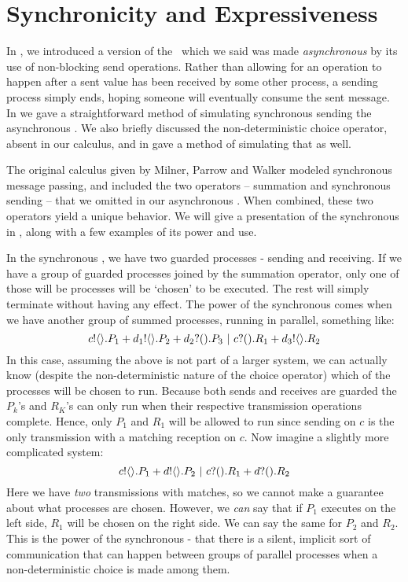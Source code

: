 
\chapter{Synchronicity and Expressiveness}
In , we introduced a version of the \picalc\ which we said was made \emph{asynchronous} by its use of non-blocking send operations.  Rather than allowing for an operation to happen after a sent value has been received by some other process, a sending process simply ends, hoping someone will eventually consume the sent message.  In  we gave a straightforward method of simulating synchronous sending the asynchronous \picalc.  We also briefly discussed the non-deterministic choice operator, absent in our calculus, and in  gave a method of simulating that as well.

The original calculus given by Milner, Parrow and Walker modeled synchronous message passing, and included the two operators -- summation and synchronous sending -- that we omitted in our asynchronous \picalc.  When combined, these two operators yield a unique behavior.  We will give a presentation of the synchronous \picalc in , along with a few examples of its power and use.

In the synchronous \picalc, we have two guarded processes - sending and receiving.  If we have a group of guarded processes joined by the summation operator, only one of those will be processes will be `chosen' to be executed.  The rest will simply terminate without having any effect.  The power of the synchronous \picalc comes when we have another group of summed processes, running in parallel, something like: 
\[
	{c}!\langle{}\rangle.P_1 + {d_1}!\langle{}\rangle.P_2 + {d_2}?({}).P_3 \ |\  {c}?({}).R_1 + {d_3}!\langle{}\rangle.R_2
\]
In this case, assuming the above is not part of a larger system, we can actually know (despite the non-deterministic nature of the choice operator) which of the processes will be chosen to run.  Because both sends and receives are guarded the $P_k$'s and $R_K$'s can only run when their respective transmission operations complete.  Hence, only $P_1$ and $R_1$ will be allowed to run since sending on $c$ is the only transmission with a matching reception on $c$.  Now imagine a slightly more complicated system:
\[
	{c}!\langle{}\rangle.P_1 + {d}!\langle{}\rangle.P_2 \ |\  {c}?({}).R_1 + {d}?({}).R_2
\]
Here we have \emph{two} transmissions with matches, so we cannot make a guarantee about what processes are chosen.  However, we \emph{can} say that if $P_1$ executes on the left side, $R_1$ will be chosen on the right side.  We can say the same for $P_2$ and $R_2$.  This is the power of the synchronous \picalc - that there is a silent, implicit sort of communication that can happen between groups of parallel processes when a non-deterministic choice is made among them.

